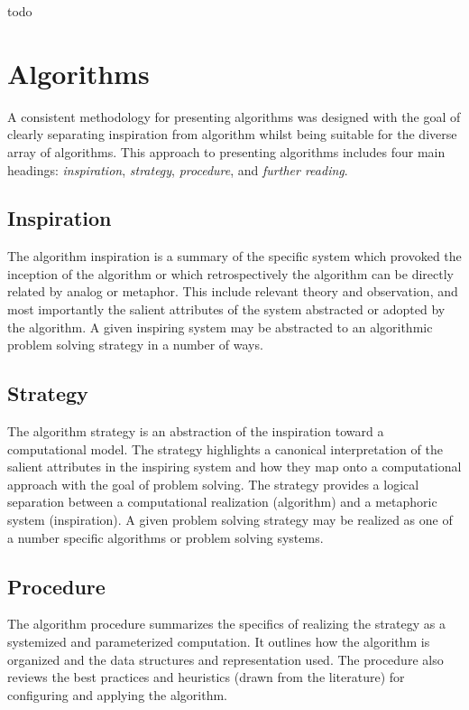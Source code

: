 todo

\section{Algorithms}
\label{sec:intro:techniques}
A consistent methodology for presenting algorithms was designed with the goal of clearly separating inspiration from algorithm whilst being suitable for the diverse array of algorithms. This approach to presenting algorithms includes four main headings: \emph{inspiration}, \emph{strategy}, \emph{procedure}, and \emph{further reading}.

\subsection{Inspiration}
The algorithm inspiration is a summary of the specific system which provoked the inception of the algorithm or which retrospectively the algorithm can be directly related by analog or metaphor. This include relevant theory and observation, and most importantly the salient attributes of the system abstracted or adopted by the algorithm. A given inspiring system may be abstracted to an algorithmic problem solving strategy in a number of ways.

\subsection{Strategy}
The algorithm strategy is an abstraction of the inspiration toward a computational model. The strategy highlights a canonical interpretation of the salient attributes in the inspiring system and how they map onto a computational approach with the goal of problem solving. The strategy provides a logical separation between a computational realization (algorithm) and a metaphoric system (inspiration). A given problem solving strategy may be realized as one of a number specific algorithms or problem solving systems.

\subsection{Procedure}
The algorithm procedure summarizes the specifics of realizing the strategy as a systemized and parameterized computation. It outlines how the algorithm is organized and the data structures and representation used. The procedure also reviews the best practices and heuristics (drawn from the literature) for configuring and applying the algorithm.

